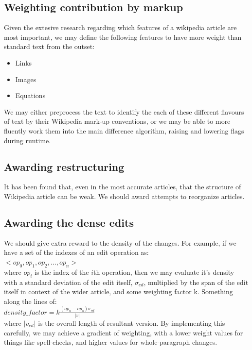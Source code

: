 \documentclass[a4paper,11pt,twoside,notitlepage]{article}
\begin{document}
        \subsection*{Weighting contribution by markup}
        Given the extesive research regarding which features of a
        wikipedia article are most important, we may define the
        following features to have more weight than standard text from
        the outset:
        \begin{itemize}
          \item Links
          \item Images
          \item Equations
        \end{itemize}

        We may either preprocess the text to identify the each of
        these different flavours of text by their Wikipedia mark-up
        conventions, or we may be able to more fluently work them into
        the main difference algorithm, raising and lowering flags
        during runtime.

        \subsection*{Awarding restructuring}
        It has been found that, even in the most accurate articles,
        that the structure of Wikipedia article can be
        weak.\cite{Giles2005} We should award attempts to reorganize
        articles.
        
        \subsection*{Awarding the dense edits}
        We should give extra reward to the density of the
        changes. For example, if we have a set of the indexes of an
        edit operation as:\\
        $<op_0,op_1,op_2,\dots, op_n>$\\
        where $op_i$ is the index of the $i$th operation, then we may
        evaluate it's density with a standard deviation of the edit
        itself, $\sigma_{ed}$, multiplied by the span of the edit
        itself in context of the wider article, and some weighting
        factor k. Something along the lines of:\\
        $density\_factor = k\frac{(op_n - op_o)\sigma_{ed}}{|v|}$\\ 
        where $|v_{ed}|$ is the overall length of resultant version. By
        implementing this carefully, we may achieve a gradient of
        weighting, with a lower weight values for things like
        spell-checks, and higher values for whole-paragraph changes.
\end{document}
